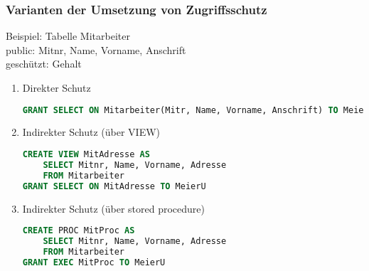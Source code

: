 \subsubsection{Varianten der Umsetzung von Zugriffsschutz}
Beispiel: Tabelle Mitarbeiter\\
public: Mitnr, Name, Vorname, Anschrift\\
geschützt: Gehalt
\begin{enumerate}
\item Direkter Schutz
\begin{lstlisting}[language=SQL]
GRANT SELECT ON Mitarbeiter(Mitr, Name, Vorname, Anschrift) TO MeierU
\end{lstlisting}
\item Indirekter Schutz (über VIEW)
\begin{lstlisting}[language=SQL]
CREATE VIEW MitAdresse AS 
	SELECT Mitnr, Name, Vorname, Adresse
	FROM Mitarbeiter
GRANT SELECT ON MitAdresse TO MeierU
\end{lstlisting}
\item Indirekter Schutz (über stored procedure)
\begin{lstlisting}[language=SQL]
CREATE PROC MitProc AS
	SELECT Mitnr, Name, Vorname, Adresse
	FROM Mitarbeiter
GRANT EXEC MitProc TO MeierU
\end{lstlisting}
\end{enumerate}

